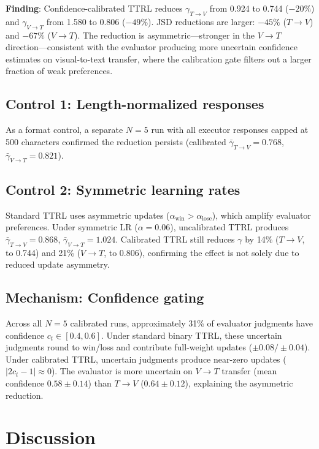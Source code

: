 \documentclass[11pt]{article}
\begin{document}
\textbf{Finding}: Confidence-calibrated TTRL reduces $\gamma_{T\to V}$ from 0.924 to 0.744 (${-}20\%$) and $\gamma_{V\to T}$ from 1.580 to 0.806 (${-}49\%$). JSD reductions are larger: ${-}45\%$ ($T{\to}V$) and ${-}67\%$ ($V{\to}T$). The reduction is asymmetric---stronger in the $V{\to}T$ direction---consistent with the evaluator producing more uncertain confidence estimates on visual-to-text transfer, where the calibration gate filters out a larger fraction of weak preferences.

\subsection{Control 1: Length-normalized responses}
As a format control, a separate $N{=}5$ run with all executor responses capped at 500 characters confirmed the reduction persists (calibrated $\bar{\gamma}_{T{\to}V}{=}0.768$, $\bar{\gamma}_{V{\to}T}{=}0.821$).

\subsection{Control 2: Symmetric learning rates}
Standard TTRL uses asymmetric updates ($\alpha_{\text{win}} > \alpha_{\text{lose}}$), which amplify evaluator preferences. Under symmetric LR ($\alpha{=}0.06$), uncalibrated TTRL produces $\bar{\gamma}_{T{\to}V}{=}0.868$, $\bar{\gamma}_{V{\to}T}{=}1.024$. Calibrated TTRL still reduces $\gamma$ by 14\% ($T{\to}V$, to 0.744) and 21\% ($V{\to}T$, to 0.806), confirming the effect is not solely due to reduced update asymmetry.

\subsection{Mechanism: Confidence gating}
Across all $N{=}5$ calibrated runs, approximately 31\% of evaluator judgments have confidence $c_t \in [0.4, 0.6]$. Under standard binary TTRL, these uncertain judgments round to win/loss and contribute full-weight updates ($\pm0.08/\pm0.04$). Under calibrated TTRL, uncertain judgments produce near-zero updates ($|2c_t{-}1| \approx 0$). The evaluator is more uncertain on $V{\to}T$ transfer (mean confidence $0.58{\pm}0.14$) than $T{\to}V$ ($0.64{\pm}0.12$), explaining the asymmetric reduction.

\section{Discussion}
\end{document}
